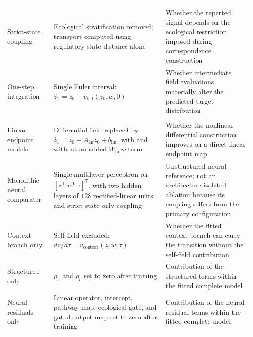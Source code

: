 \begin{longtable}{@{}>{\raggedright\arraybackslash}p{}%
                     >{\raggedright\arraybackslash}p{}%
                     >{\raggedright\arraybackslash}p{}@{}}
\midrule
\multicolumn{3}{l}{\textit{Coupling and integration}}\\
\addlinespace[0.3em]

Strict-state coupling
& Ecological stratification removed; transport computed using regulatory-state
distance alone
& Whether the reported signal depends on the ecological restriction imposed
during correspondence construction \\

\addlinespace[0.3em]
One-step integration
& Single Euler interval:
\(\widehat{z}_1=z_0+v_{\mathrm{full}}(z_0,w,0)\)
& Whether intermediate field evaluations materially alter the predicted target
distribution \\

\midrule
\multicolumn{3}{l}{\textit{Architecture and fitted components}}\\
\addlinespace[0.3em]

Linear endpoint models
& Differential field replaced by
\(\widehat{z}_1=z_0+A_{\mathrm{lin}}z_0+b_{\mathrm{lin}}\), with and without
an added \(W_{\mathrm{lin}}w\) term
& Whether the nonlinear differential construction improves on a direct linear
endpoint map \\

\addlinespace[0.3em]
Monolithic neural comparator
& Single multilayer perceptron on
\([z^{\mathsf T}\;w^{\mathsf T}\;\tau]^{\mathsf T}\), with two hidden layers
of \(128\) rectified-linear units and strict state-only coupling
& Unstructured neural reference; not an architecture-isolated ablation because
its coupling differs from the primary configuration \\

\addlinespace[0.3em]
Context-branch only
& Self field excluded:
\(dz/d\tau=v_{\mathrm{context}}(z,w,\tau)\)
& Whether the fitted context branch can carry the transition without the
self-field contribution \\

\addlinespace[0.3em]
Structured-only
& \(\rho_s\) and \(\rho_c\) set to zero after training
& Contribution of the structured terms within the fitted complete model \\

\addlinespace[0.3em]
Neural-residuals-only
& Linear operator, intercept, pathway map, ecological gate, and gated output
map set to zero after training
& Contribution of the neural residual terms within the fitted complete model \\

\end{longtable}

